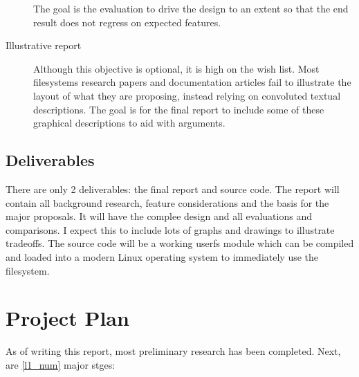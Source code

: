 \begin{description}
            The goal is the evaluation to drive the design to an extent so that
            the end result does not regress on expected features.

        \item[Illustrative report]

            Although this objective is optional, it is high on the wish list.
            Most filesystems research papers and documentation articles fail to
            illustrate the layout of what they are proposing, instead relying
            on convoluted textual descriptions. The goal is for the final
            report to include some of these graphical descriptions to aid with
            arguments.

    \end{description}


\subsection{Deliverables}

    There are only 2 deliverables: the final report and source code. The report
    will contain all background research, feature considerations and the basis
    for the major proposals. It will have the complee design and all
    evaluations and comparisons. I expect this to include lots of graphs and
    drawings to illustrate tradeoffs. The source code will be a working userfs
    module which can be compiled and loaded into a modern Linux operating
    system to immediately use the filesystem.

%
%
\section{Project Plan}

    As of writing this report, most preliminary research has been completed.
    Next, are \ref{l1_num} major stges:


